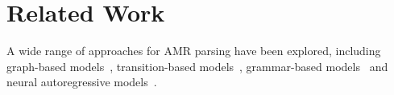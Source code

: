 \documentclass[11pt]{article}
\begin{document}
\begin{comment}

Figures~\ref{fig:ceos_greedy}-\ref{fig:ceos_vae} present an example from the development set.
The VAE model segments the graph in the most intuitive way, while the greedy segmentation can be arbitrary, and the rule-based segmentation failed to handle all nodes.\footnote{Non-aligned nodes are aligned to other tokens not shown in the figure.}  
Clearly, the heuristic segmentation gives superior performance. It turns out that the heuristics covers most cases correctly (in terms of coincide with intuition), We can take a look at one more complicated example to see how heuristics works. 
\begin{lstlisting}[  basicstyle=\small]
(c / consider-01
    :ARG1 (p2 / person
      :domain (t2 / they)
      :ARG0-of (b / betray-01
        :ARG1 (c2 / country
           :name (n2 / name :op1 "China"))))
    :mod (m / more)
    :mod (t4 / tyrannize-01
      :ARG2 (c3 / culture)
      :ARG1-of (c4 / cloak-01
        :ARG2 (a / and
          :op1 (n / nationalism)
          :op2 (p / patriotism)))))
\end{lstlisting}
The original sentence is `What is more they are considered traitors of China, which is a fact of cultural tyranny in the cloak of nationalism and patriotism.' It turns out only `country', `name','person' is not aligned. Following our heuristics,  `country', `name' will be linked to `China', and `person' linked to `betray-01' ('betray-01' is aligned to traitors due to Propbank resources). 
\end{comment}

\section{Related Work}\label{sec:related}
A wide range of approaches for AMR parsing have been explored, including graph-based models~\cite{Flanigan2014ADG,Werling2015RobustSG,lyu-titov-2018-amr,Zhang2019AMRPA}, transition-based models~\cite{Damonte2017AnIP,Ballesteros2017AMRPU}, grammar-based models~\cite{peng-etal-2015-synchronous,Artzi2015BroadcoverageCS,Groschwitz2018AMRDP,Lindemann2020FastSP} and neural autoregressive models~\cite{Konstas2017NeuralAS,Noord2017NeuralSP,Zhang2019BroadCoverageSP,Cai2020AMRPV,Xu2020ImprovingAP}. 
\end{document}
